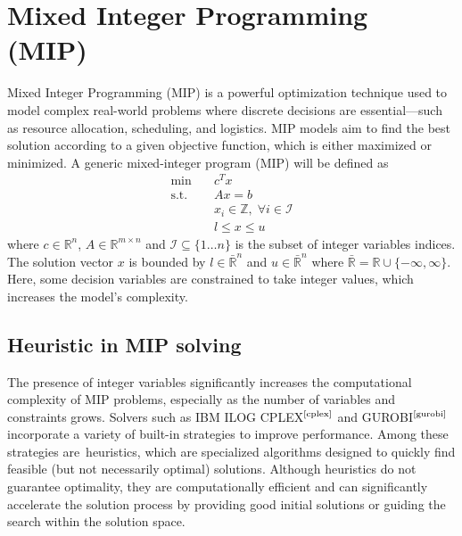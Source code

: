 \section{Mixed Integer Programming (MIP)}
Mixed Integer Programming (MIP) is a powerful optimization technique used to model complex real-world problems where discrete decisions are essential—such as resource allocation, scheduling, and logistics.
MIP models aim to find the best solution according to a given objective function, which is either maximized or minimized.
A generic mixed-integer program (MIP) will be defined as
\begin{align*}
\text{min} \quad & c^T x \\
\text{s.t.} \quad & Ax = b \\
                        & x_i \in \mathbb{Z},\; \forall i \in \mathcal{I} \\
                        & l \le x \le u
\end{align*}
where $c \in \mathbb{R}^n$, $A \in \mathbb{R}^{m \times n}$ and $\mathcal{I}\subseteq\{1\dots n\}$ is the subset of integer variables indices. The solution vector $x$ is bounded by $l \in \bar{\mathbb{R}}^n$ and $u \in \bar{\mathbb{R}}^n$ where $\bar{\mathbb{R}}= \mathbb{R} \cup \{-\infty,\infty\}$.
Here, some decision variables are constrained to take integer values, which increases the model’s complexity.
\subsection{Heuristic in MIP solving}
The presence of integer variables significantly increases the computational complexity of MIP problems, especially as the number of variables and constraints grows. Solvers such as IBM ILOG CPLEX$^\text{\cite{cplex}}$ and GUROBI$^\text{\cite{gurobi}}$ incorporate a variety of built-in strategies to improve performance. Among these strategies are heuristics, which are specialized algorithms designed to quickly find feasible (but not necessarily optimal) solutions. Although heuristics do not guarantee optimality, they are computationally efficient and can significantly accelerate the solution 
process by providing good initial solutions or guiding the search within the solution space.

